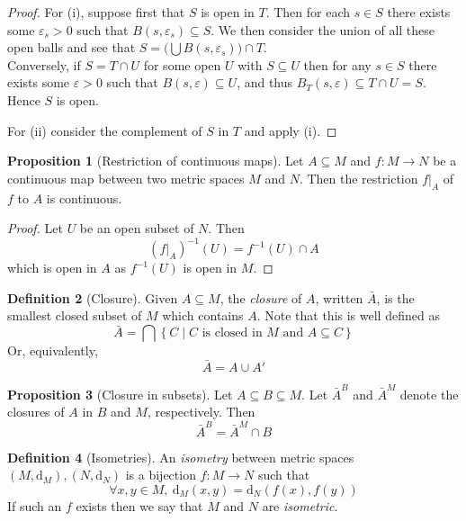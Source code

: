 \documentclass[10pt,fleqn]{article}
\newcommand{\met}{\mathrm{d}}
\newcommand{\eps}{\varepsilon}
\theoremstyle{definition} \newtheorem{defn}{Definition}[section]
\theoremstyle{plain}      \newtheorem{thm}[defn]{Theorem}
\theoremstyle{definition} \newtheorem{prop}[defn]{Proposition}
\theoremstyle{definition} \newtheorem{cor}[defn]{Corollary}
\theoremstyle{definition} \newtheorem{ex}[defn]{Example}
\theoremstyle{definition} \newtheorem{rem}[defn]{Remark}
\begin{document}
\begin{proof}
    For (i), suppose first that $S$ is open in $T$.
    Then for each $s\in S$ there exists some $\eps_s>0$ such that $B(s,\eps_s)\subseteq S$.
    We then consider the union of all these open balls and see that $S=\big(\bigcup B(s,\eps_s)\big)\cap T$.\\
    Conversely, if $S=T\cap U$ for some open $U$ with $S\subseteq U$ then for any $s\in S$ there exists some $\eps>0$ such that $B(s,\eps)\subseteq U$, and thus $B_T(s,\eps)\subseteq T\cap U = S$.
    Hence $S$ is open.

    For (ii) consider the complement of $S$ in $T$ and apply (i).
\end{proof}

\begin{prop}[Restriction of continuous maps]
    Let $A\subseteq M$ and \mbox{$f\colon M\to N$} be a continuous map between two metric spaces $M$ and $N$.
    Then the restriction $f\big|_A$ of $f$ to $A$ is continuous.
\end{prop}

\begin{proof}
    Let $U$ be an open subset of $N$.
    Then
    \[
        (f\big|_A)^{-1}(U) = f^{-1}(U)\cap A
    \]
    which is open in $A$ as $f^{-1}(U)$ is open in $M$.
\end{proof}

\begin{defn}[Closure]
    Given $A\subseteq M$, the \emph{closure} of $A$, written $\bar{A}$, is the smallest closed subset of $M$ which contains $A$.
    Note that this is well defined as
    \[
        \bar{A}=
        \bigcap\left\{C \mid C\text{ is closed in }M\text{ and }A\subseteq C\right\}
    \]
    Or, equivalently,
    \[
        \bar{A} = A\cup A'
    \]
\end{defn}

\begin{prop}[Closure in subsets]
    Let $A\subseteq B\subseteq M$.
    Let $\bar{A}^B$ and $\bar{A}^M$ denote the closures of $A$ in $B$ and $M$, respectively.
    Then
    \[
        \bar{A}^B=\bar{A}^M\cap B
    \]
\end{prop}

\begin{defn}[Isometries]\label{isometry-definition}
    An \emph{isometry} between metric spaces $(M,\met_M),(N,\met_N)$ is a bijection $f:M\to N$ such that
    \[
        \forall x,y\in M,~
        \met_M(x,y)=\met_N(f(x),f(y))
    \]
    If such an $f$ exists then we say that $M$ and $N$ are \emph{isometric}.
\end{defn}
\end{document}
